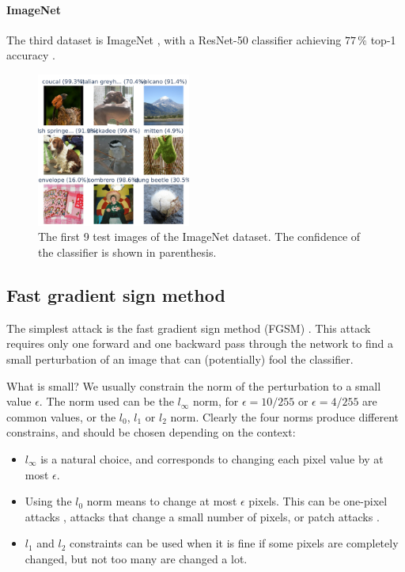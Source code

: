 \documentclass[]{scrarticle}
\begin{document}
\paragraph{ImageNet}
The third dataset is ImageNet \cite{Deng2009ImageNetAL}, with a ResNet-50 classifier
achieving $77\,\%$ top-1 accuracy \cite{He2015DeepRL}.

\begin{figure}[h]
  \centering
  \includegraphics[width=0.45\textwidth]{images/sample_ImageNet.png}
  \caption{The first 9 test images of the ImageNet dataset.
    The confidence of the classifier is shown in parenthesis.}
  \label{fig:imagenet_samples}
\end{figure}


\subsection{Fast gradient sign method}
The simplest attack is the fast gradient sign method (FGSM) \cite{goodfellow2014explaining}.
This attack requires only one forward and one backward pass through the network
to find a small perturbation of an image that can (potentially) fool the classifier.

What is small? We usually constrain the norm of the perturbation to
a small value $\epsilon$. The norm used can be the $l_\infty$ norm,
for $\epsilon = 10 / 255$ or $\epsilon = 4 / 255$ are common values,
or the $l_0$, $l_1$ or $l_2$ norm.
Clearly the four norms produce different constrains, and should be chosen
depending on the context:
\begin{itemize}
  \item $l_\infty$ is a natural choice, and corresponds to changing each
    pixel value by at most $\epsilon$.
  \item Using the $l_0$ norm means to change at most $\epsilon$ pixels. This
    can be one-pixel attacks \cite{Su2017OnePA},
    attacks that change a small number of pixels,
    or patch attacks \cite{Brown2017AdversarialP}.
  \item $l_1$ and $l_2$ constraints can be used when it is fine if
    some pixels are completely changed, but not too many are changed
    a lot.
\end{itemize}
\end{document}
